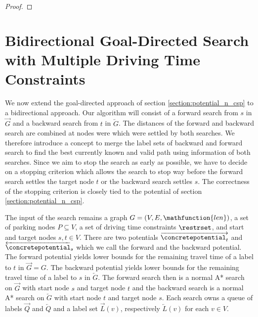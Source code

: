 \begin{proof}
\end{proof}

\section{Bidirectional Goal-Directed Search with Multiple Driving Time Constraints\label{sec:bidir_astar}}
We now extend the goal-directed approach of section \ref{section:potential_n_csp} to a bidirectional approach. Our algorithm will consist of a forward search from $s$ in $\overrightarrow{G}$ and a backward search from $t$ in $\overleftarrow{G}$. The distances of the forward and backward search are combined at nodes were which were settled by both searches. We therefore introduce a concept to merge the label sets of backward and forward search to find the best currently known and valid path using information of both searches. Since we aim to stop the search as early as possible, we have to decide on a stopping criterion which allows the search to stop way before the forward search settles the target node $t$ or the backward search settles $s$. The correctness of the stopping criterion is closely tied to the potential of section \ref{section:potential_n_csp}.

The input of the search remains a graph $G=(V,E,\mathfunction{len})$, a set of parking nodes $P \subseteq V$, a set of driving time constraints $\restrset$, and start and target nodes $s,t \in V$. There are two potentials $\overrightarrow{\concretepotential_t}$ and $\overleftarrow{\concretepotential}_s$ which we call the forward and the backward potential. The forward potential yields lower bounds for the remaining travel time of a label to $t$ in $\overrightarrow{G}=G$. The backward potential yields lower bounds for the remaining travel time of a label to $s$ in $\overleftarrow{G}$. The forward search then is a normal A* search on $\overrightarrow{G}$ with start node $s$ and target node $t$ and the backward search is a normal A* search on $\overleftarrow{G}$ with start node $t$ and target node $s$. Each search owns a queue of labels $\overrightarrow{Q}$ and $\overleftarrow{Q}$ and a label set $\overrightarrow{L}(v)$, respectively $\overleftarrow{L}(v)$ for each $v \in V$.

